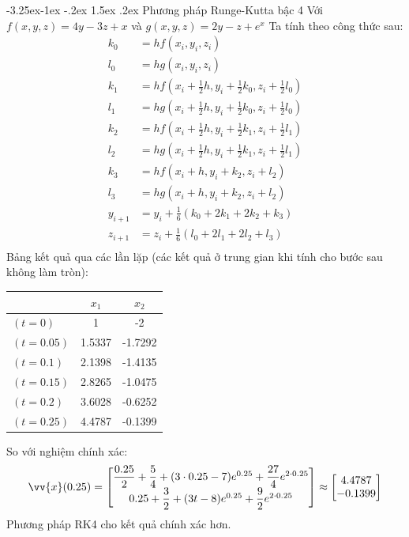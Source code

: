 \documentclass[a4paper]{article}
\makeatletter
\newcounter {subsubsubsection}[subsubsection]
\newcommand\subsubsubsection{\@startsection{subsubsubsection}{4}{\z@}%
                                     {-3.25ex\@plus -1ex \@minus -.2ex}%
                                     {1.5ex \@plus .2ex}%
                                     {\normalfont\normalsize\bfseries}}
\makeatother
\begin{document}
\subsubsubsection{Phương pháp Runge-Kutta bậc 4}
Với $f(x,y,z) = 4y - 3z + x$ và  $g(x,y,z) = 2y - z + e^x$
Ta tính theo công thức sau:
\begin{equation*}
    \begin{aligned}
    k_0 &= hf(x_i,y_i,z_i) \\
    l_0 &= hg(x_i,y_i,z_i) \\
    k_1 &= hf(x_i+\frac{1}{2}h,y_i+\frac{1}{2}k_0,z_i+\frac{1}{2}l_0) \\
    l_1 &= hg(x_i+\frac{1}{2}h,y_i+\frac{1}{2}k_0,z_i+\frac{1}{2}l_0) \\
    k_2 &= hf(x_i+\frac{1}{2}h,y_i+\frac{1}{2}k_1,z_i+\frac{1}{2}l_1) \\ 
    l_2 &= hg(x_i+\frac{1}{2}h,y_i+\frac{1}{2}k_1,z_i+\frac{1}{2}l_1) \\
    k_3 &= hf(x_i+h,y_i+k_2,z_i+l_2) \\
    l_3 &= hg(x_i+h,y_i+k_2,z_i+l_2) \\
    y_{i+1} &= y_i + \frac{1}{6}(k_0+2k_1+2k_2+k_3) \\
    z_{i+1} &= z_i + \frac{1}{6}(l_0+2l_1+2l_2+l_3) \\
    \end{aligned}
\end{equation*}
Bảng kết quả qua các lần lặp (các kết quả ở trung gian khi tính cho bước sau không làm tròn): \par
\begin{table}[!h]
\begin{tabular}{l|cc}
\multicolumn{1}{c|}{} & $x_1$                    & $x_2$                      \\ \hline
$(t = 0)$         & 1                            & -2                     \\
$(t = 0.05)$      & 1.5337                       & -1.7292                   \\
$(t = 0.1)$       & 2.1398                       & -1.4135                 \\
$(t = 0.15)$      & 2.8265                       & -1.0475       \\
$(t = 0.2)$       & 3.6028                       & -0.6252       \\
$(t = 0.25)$      & 4.4787                       & -0.1399  
\end{tabular}
\end{table}
So với nghiệm chính xác: 
\begin{equation*}
    \vv{x}(0.25) = 
    \begin{bmatrix}
        \dfrac{0.25}{2} + \dfrac{5}{4} + (3\cdot0.25 - 7)e^{0.25} + \dfrac{27}{4}e^{2\cdot0.25} \\
        0.25 + \dfrac{3}{2} + (3t-8)e^{0.25} + \dfrac{9}{2}e^{2\cdot0.25}
    \end{bmatrix}
    \approx
    \begin{bmatrix}
        4.4787 \\
        -0.1399
    \end{bmatrix}
\end{equation*}
Phương pháp RK4 cho kết quả chính xác hơn.
\newpage
\end{document}
